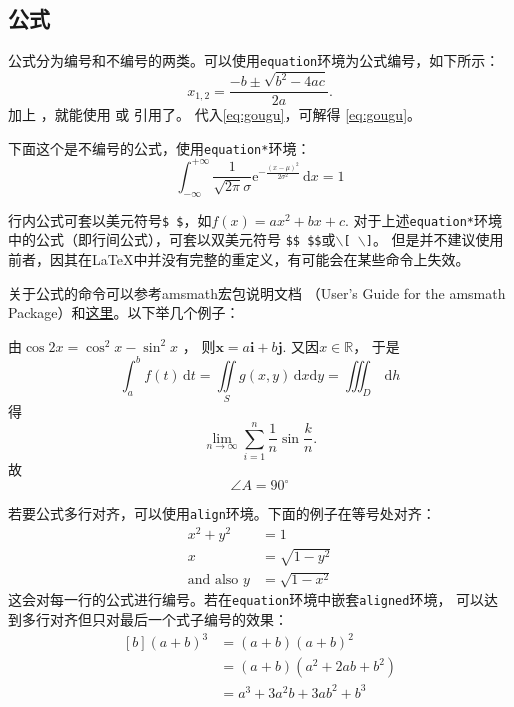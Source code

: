     \subsection{公式}\label{subsec:eq}
        公式分为编号和不编号的两类。可以使用\texttt{equation}环境为公式编号，如下所示：
        \begin{equation}\label{eq:gougu}
            x_{1,2}=\frac{{-b \pm \sqrt{{b^2}-4ac}}}{{2a}}.
        \end{equation}
		加上 ，就能使用 或 引用了。
		代入\ref{eq:gougu}，可解得 \eqref{eq:gougu}。

        下面这个是不编号的公式，使用\texttt{equation*}环境：
        \begin{equation*}
            \int_{-\infty}^{+\infty}\frac{1}{\sqrt{2\pi}\sigma}\mathrm{e}^{ -\tfrac{(x-\mu)^2}{2\sigma^2}} \,\mathrm{d}x =1
        \end{equation*}
		
        行内公式可套以美元符号\texttt{\$ \$}，如$f(x)=ax^2+bx+c$.
		对于上述\texttt{equation*}环境中的公式（即行间公式），可套以双美元符号
		\texttt{\$\$ \quad{}\$\$}或\texttt{$\backslash$[ \quad{}$\backslash$]}。
		但是并不建议使用前者，因其在\LaTeX{}中并没有完整的重定义，有可能会在某些命令上失效。
		
		关于公式的命令可以参考\textsf{amsmath}宏包说明文档
		（User's Guide for the amsmath Package）和\href{http://media.cism.it/attachments/ch8.pdf}{这里}。以下举几个例子：
    
        由$\cos 2x=\cos^2x-\sin^2x$ ，		%
        则$\boldsymbol{x}=a\bm{i}+b\bm{j}.$	%
        又因$x\in \mathbb{R} $，			%
        于是
        \[
        \int_a^b f(t)\,\mathrm{d}t = \iint\limits_S g(x,y)\,\mathrm{d}x\mathrm{d}y = \iiint\nolimits_D\, \mathrm{d}h		%
            \]
        得
        $$\lim_{n \to \infty}\sum_{i=1}^n{\frac{1}{n}}\sin\frac{k}{n}.$$	%
        故
        \begin{equation}\label{eq:quadratic}
            \angle A = 90^\circ			%
        \end{equation}

	    若要公式多行对齐，可以使用\texttt{align}环境。下面的例子在等号处对齐：
	    \begin{align}
	        x^2 + y^2 &= 1               \\
            x         &= \sqrt{1-y^2}    \\\text{and also }
                    y &=\sqrt{1-x^2}
        \end{align}
		这会对每一行的公式进行编号。若在\texttt{equation}环境中嵌套\texttt{aligned}环境，
		可以达到多行对齐但只对最后一个式子编号的效果：
        \begin{equation}
            \begin{aligned}[b]
              (a + b)^3	&= (a + b) (a + b)^2        \\
	    			    &= (a + b)(a^2 + 2ab + b^2) \\
	    			    &= a^3 + 3a^2b + 3ab^2 + b^3
            \end{aligned}
        \end{equation}

